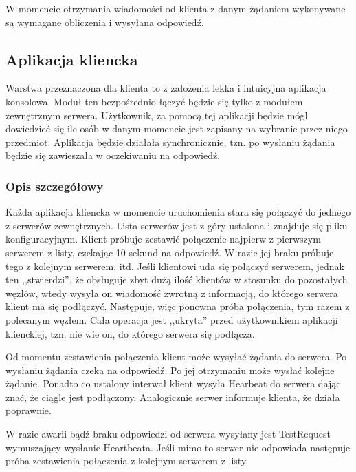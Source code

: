 {\par{W momencie otrzymania wiadomości od klienta z danym żądaniem wykonywane są wymagane obliczenia i wysyłana odpowiedź.}


\subsection[Aplikacja kliencka]{Aplikacja kliencka}

\par{Warstwa przeznaczona dla klienta to z założenia lekka i intuicyjna aplikacja konsolowa. Moduł ten bezpośrednio łączyć będzie się tylko z modułem zewnętrznym serwera. Użytkownik, za pomocą tej aplikacji będzie mógł dowiedzieć się ile osób w danym momencie jest zapisany na wybranie przez niego przedmiot. Aplikacja będzie działała synchronicznie, tzn. po wysłaniu żądania będzie się zawieszała w oczekiwaniu na odpowiedź.}

\subsubsection*[Opis szczegółowy]{Opis szczegółowy}
\par{Każda aplikacja kliencka w momencie uruchomienia stara się połączyć do jednego z serwerów zewnętrznych. Lista serwerów jest z góry ustalona i znajduje się pliku konfiguracyjnym. Klient próbuje zestawić połączenie najpierw z pierwszym serwerem z listy, czekając 10 sekund na odpowiedź. W razie jej braku próbuje tego z kolejnym serwerem, itd. Jeśli klientowi uda się połączyć serwerem, jednak ten ,,stwierdzi'', że obsługuje zbyt dużą ilość klientów w stosunku do pozostałych węzłów, wtedy wysyła on wiadomość zwrotną z informacją, do którego serwera klient ma się podłączyć. Następuje, więc ponowna próba połączenia, tym razem z polecanym węzłem. Cała operacja jest ,,ukryta'' przed użytkownikiem aplikacji klienckiej, tzn. nie wie on, do którego serwera się podłącza.}

\par{Od momentu zestawienia połączenia klient może wysyłać żądania do serwera. Po wysłaniu żądania czeka na odpowiedź. Po jej otrzymaniu może wysłać kolejne żądanie. Ponadto co ustalony interwał klient wysyła Hearbeat do serwera dając znać, że ciągle jest podłączony. Analogicznie serwer informuje klienta, że działa poprawnie.}

\par{W razie awarii bądź braku odpowiedzi od serwera wysyłany jest TestRequest wymuszający wysłanie Heartbeata. Jeśli mimo to serwer nie odpowiada następuje próba zestawienia połączenia z kolejnym serwerem z listy.}


}
